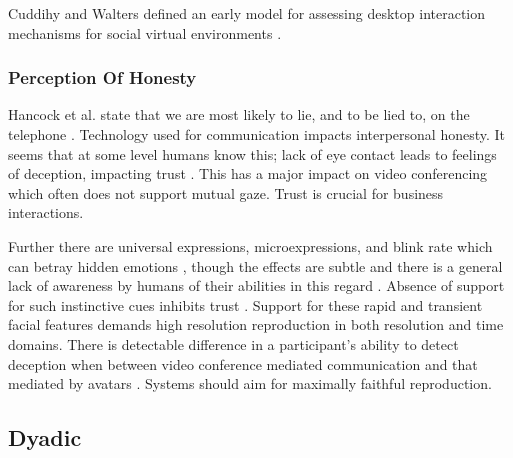 Cuddihy and Walters defined an early model for assessing desktop interaction mechanisms for social virtual environments \cite{Cuddihy2000}.                               
\subsubsection{Perception Of Honesty}
Hancock et al. state that we are most likely to lie, and to be lied to, on the telephone \cite{Hancock2004}. Technology used for communication impacts interpersonal honesty. It seems that at some level humans know this; lack of eye contact leads to feelings of deception, impacting trust \cite{Holm2010}. This has a major impact on video conferencing which often does not support mutual gaze. Trust is crucial for business interactions.\par
Further there are universal expressions, microexpressions, and blink rate which can betray hidden emotions \cite{porter2008reading}, though the effects are subtle and there is a general lack of awareness by humans of their abilities in this regard \cite{Holm2010}. Absence of support for such instinctive cues inhibits trust \cite{Roberts2015}. Support for these rapid and transient facial features demands high resolution reproduction in both resolution and time domains. There is detectable difference in a participant's ability to detect deception when between video conference mediated communication and that mediated by avatars \cite{Steptoe2010b}. Systems should aim for maximally faithful reproduction. 
\subsection{Dyadic}
